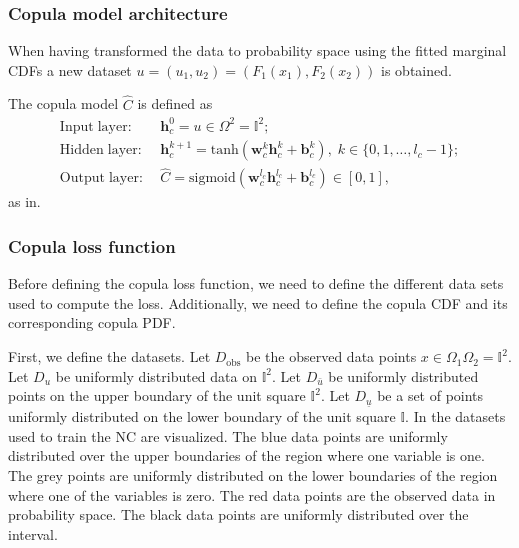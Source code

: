 \subsubsection{Copula model architecture} 
When having transformed the data to probability space using the fitted marginal \gls{CDF}s a new dataset $u = (u_1,u_2) = (F_1(x_1), F_2(x_2))$ is obtained. 

The copula model $\hat{C}$ is defined as 
\begin{align*}
    \mathrm{Input\;layer:} \; & \mathbf{h}_c^0 = u \in \Omega^2 = \mathbb{I}^2; \\
    \mathrm{Hidden\;layer:} \; & \mathbf{h}_c^{k+1} = \mathrm{tanh}(\mathbf{w}_c^{k} \mathbf{h}_c^{k} + \mathbf{b}_c^{k}), \; k \in \{0,1, \dots, l_c -1 \};\\
    \mathrm{Output\;layer:} \; & \hat{C} = \mathrm{sigmoid}(\mathbf{w}_c^{l_c} \mathbf{h}_c^{l_c} + \mathbf{b}_c^{l_c}) \in \left[0,1 \right],
\end{align*}
as in.


\subsubsection{Copula loss function}\label{sec:NeuralCopulaLoss}
Before defining the copula loss function, we need to define the different data sets used to compute the loss. Additionally, we need to define the copula \gls{CDF} and its corresponding copula \gls{PDF}. 

First, we define the datasets. Let $D_{\mathrm{obs}}$ be the observed data points $x \in \Omega_1\Omega_2  = \mathbb{I}^2$. Let $D_{u}$ be uniformly distributed data on $\mathbb{I}^2$. Let $D_{\bar{u}}$ be uniformly distributed points on the upper boundary of the unit square $\mathbb{I}^2$. Let $D_{\underline{u}}$ be a set of points uniformly distributed on the lower boundary of the unit square $\mathbb{I}$. In  the datasets used to train the \gls{NC} are visualized. The blue data points are uniformly distributed over the upper boundaries of the region where one variable is one. The grey points are uniformly distributed on the lower boundaries of the region where one of the variables is zero. The red data points are the observed data in probability space. The black data points are uniformly distributed over the interval. 

